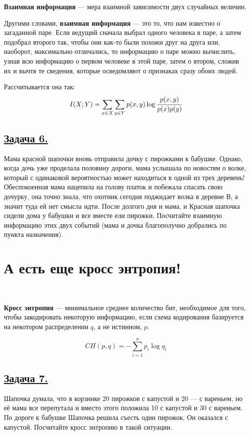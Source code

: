 \begin{siderules}
    \textbf{Взаимная информация} --- мера взаимной зависимости двух случайных величин.
\end{siderules}

Другими словами, \textbf{взаимная информация} --- это то, что нам известно о загаданной паре. Если ведущий сначала выбрал одного человека в паре, а затем подобрал второго так, чтобы они как-то были похожи друг на друга или, наоборот, максимально отличались, то информацию о паре можно вычислить, узнав всю информацию о первом человеке в этой паре, затем о втором, сложив их и вычтя те сведения, которые осведомляют о признаках сразу обоих людей.

Рассчитывается она так:
\[I(X; Y)=\sum\limits_{x\in X}\sum\limits_{y\in Y} p(x, y)\log \cfrac{p(x, y)}{p(x)p(y)} \]

\subsection*{\hyperref[sec:sol_problem6]{Задача 6.}}\label{sec:problem6} Мама красной шапочки вновь отправила дочку с пирожками к бабушке. Однако, когда дочь уже проделала половину дороги, мама услышала по новостям о волке, который с одинаковой вероятностью может находиться в одной из трех деревень! Обеспокоенная мама нацепила на голову платок и побежала спасать свою дочурку, она точно знала, что охотник сегодня поджидает волка в деревне В, а значит туда ей нет смысла идти. После долгого дня и мама, и Красная шапочка сидели дома у бабушки и все вместе ели пирожки. Посчитайте взаимную информацию этих двух событий (мама и дочка благополучно добрались по пункта назначения).

\section*{А есть еще кросс энтропия!}~\
\\

\begin{siderules}
    \textbf{Кросс энтропия} --- минимальное среднее количество бит, необходимое для того, чтобы закодировать некоторую информацию, если схема кодирования базируется на некотором распределении $q$, а не истинном, $p$.
\end{siderules}

\[CH(p, q)=-\sum\limits_{i=1}^{n}p_i\log q_i \]

\subsection*{\hyperref[sec:sol_problem7]{Задача 7.}}\label{sec:problem7} Шапочка думала, что в корзинке 20 пирожков с капустой и 20 --- с вареньем, но её мама все перепутала и вместо этого положила 10 с капустой и 30 с вареньем. По дороге к бабушке Шапочка решила съесть один пирожок. Он оказался с капустой. Посчитайте кросс энтропию в такой ситуации.

